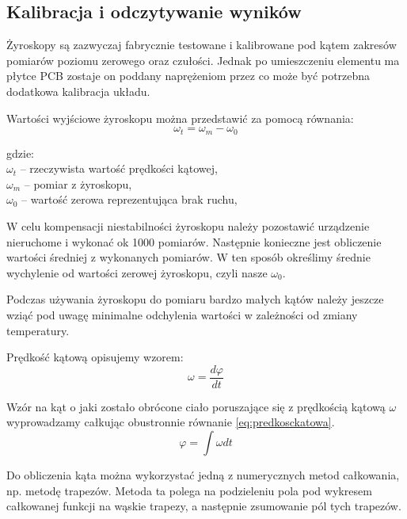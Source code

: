 \subsection{Kalibracja i odczytywanie wyników}
Żyroskopy są zazwyczaj fabrycznie testowane i kalibrowane pod kątem zakresów pomiarów poziomu zerowego oraz czułości. 
Jednak po umieszczeniu elementu ma płytce PCB zostaje on poddany naprężeniom przez co może być potrzebna dodatkowa kalibracja układu.

Wartości wyjściowe żyroskopu można przedstawić za pomocą równania:
\begin{equation}
  \omega_{t} = \omega_{m} - \omega_{0}
\end{equation}
\begin{tabbing}
  gdzie: \= \\
    \> $\omega_{t}$ -- rzeczywista wartość prędkości kątowej, \\
    \> $\omega_{m}$ -- pomiar z żyroskopu,\\
    \> $\omega_{0}$ -- wartość zerowa reprezentująca brak ruchu,\\
\end{tabbing}

W celu kompensacji niestabilności żyroskopu należy pozostawić urządzenie nieruchome i wykonać ok 1000 pomiarów. Następnie
konieczne jest obliczenie wartości średniej z wykonanych pomiarów. W ten sposób określimy średnie wychylenie od wartości
zerowej żyroskopu, czyli nasze $\omega_{0}$.

Podczas używania żyroskopu do pomiaru bardzo małych kątów należy jeszcze wziąć pod uwagę minimalne odchylenia wartości w
zależności od zmiany temperatury.

Prędkość kątową opisujemy wzorem: 
\begin{equation}
  \label{eq:predkosckatowa}
  \omega = \frac{d\varphi}{dt}
\end{equation}

Wzór na kąt o jaki zostało obrócone ciało poruszające się z prędkością kątową $\omega$ wyprowadzamy całkując obustronnie równanie \ref{eq:predkosckatowa}.
\begin{equation}
  \varphi = \int \omega dt
\end{equation}

Do obliczenia kąta można wykorzystać jedną z numerycznych metod całkowania, np. metodę trapezów. Metoda ta polega na podzieleniu pola pod wykresem całkowanej funkcji na wąskie trapezy, a następnie zsumowanie pól tych trapezów.

